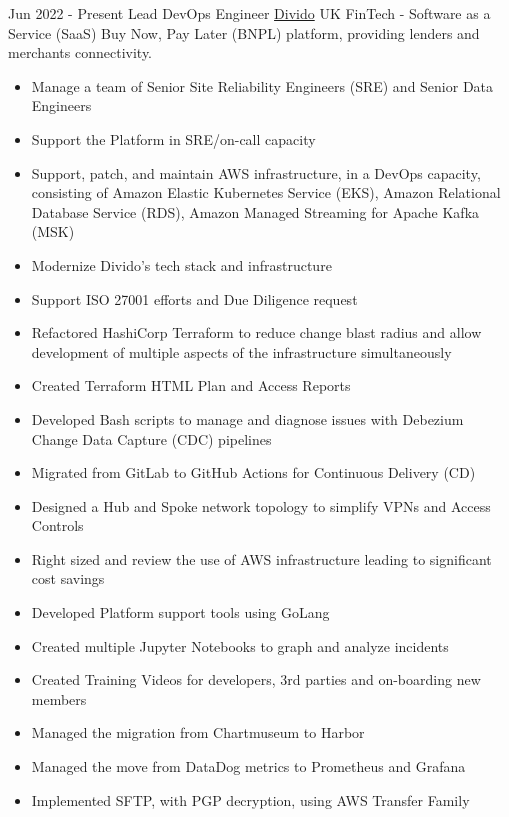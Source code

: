 
\begin{twenty}
\twentyitem
  {Jun 2022 - Present}
  {Lead DevOps Engineer}
  {{\href{https://divido.com/}{Divido}}}
  {}
  {UK}
  {FinTech - Software as a Service (SaaS) Buy Now, Pay Later (BNPL) platform, providing lenders and merchants connectivity.}
  {\begin{itemize}
    \item Manage a team of Senior Site Reliability Engineers (SRE) and Senior Data Engineers
    \item Support the Platform in SRE/on-call capacity
    \item Support, patch, and maintain AWS infrastructure, in a DevOps capacity, consisting of Amazon Elastic Kubernetes Service (EKS), Amazon Relational Database Service (RDS), Amazon Managed Streaming for Apache Kafka (MSK)
    \item Modernize Divido's tech stack and infrastructure
    \item Support ISO 27001 efforts and Due Diligence request
  \end{itemize}}
  {\begin{itemize}
    \item Refactored HashiCorp Terraform to reduce change blast radius and allow development of multiple aspects of the infrastructure simultaneously
    \item Created Terraform HTML Plan and Access Reports
    \item Developed Bash scripts to manage and diagnose issues with Debezium Change Data Capture (CDC) pipelines
    \item Migrated from GitLab to GitHub Actions for Continuous Delivery (CD)
    \item Designed a Hub and Spoke network topology to simplify VPNs and Access Controls
    \item Right sized and review the use of AWS infrastructure leading to significant cost savings
    \item Developed Platform support tools using GoLang
    \item Created multiple Jupyter Notebooks to graph and analyze incidents
    \item Created Training Videos for developers, 3rd parties and on-boarding new members
    \item Managed the migration from Chartmuseum to Harbor
    \item Managed the move from DataDog metrics to Prometheus and Grafana
    \item Implemented SFTP, with PGP decryption, using AWS Transfer Family
  \end{itemize}}
\end{twenty}

